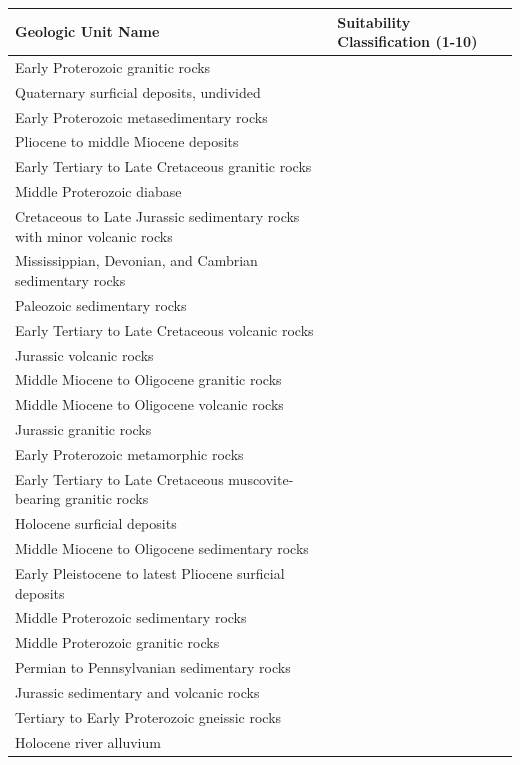 \documentclass[
]{agujournal2019}
\begin{document}
\begin{longtable}[]{@{}
  >{\raggedright\arraybackslash}p{}
  >{\raggedright\arraybackslash}p{}@{}}
\toprule\noalign{}
\begin{minipage}[b]{\linewidth}\raggedright
Geologic Unit Name
\end{minipage} & \begin{minipage}[b]{\linewidth}\raggedright
Suitability Classification (1-10)
\end{minipage} \\
\midrule\noalign{}
\endhead
\bottomrule\noalign{}
\endlastfoot
Early Proterozoic granitic rocks & \\
Quaternary surficial deposits, undivided & \\
Early Proterozoic metasedimentary rocks & \\
Pliocene to middle Miocene deposits & \\
Early Tertiary to Late Cretaceous granitic rocks & \\
Middle Proterozoic diabase & \\
Cretaceous to Late Jurassic sedimentary rocks with minor volcanic rocks
& \\
Mississippian, Devonian, and Cambrian sedimentary rocks & \\
Paleozoic sedimentary rocks & \\
Early Tertiary to Late Cretaceous volcanic rocks & \\
Jurassic volcanic rocks & \\
Middle Miocene to Oligocene granitic rocks & \\
Middle Miocene to Oligocene volcanic rocks & \\
Jurassic granitic rocks & \\
Early Proterozoic metamorphic rocks & \\
Early Tertiary to Late Cretaceous muscovite-bearing granitic rocks & \\
Holocene surficial deposits & \\
Middle Miocene to Oligocene sedimentary rocks & \\
Early Pleistocene to latest Pliocene surficial deposits & \\
Middle Proterozoic sedimentary rocks & \\
Middle Proterozoic granitic rocks & \\
Permian to Pennsylvanian sedimentary rocks & \\
Jurassic sedimentary and volcanic rocks & \\
Tertiary to Early Proterozoic gneissic rocks & \\
Holocene river alluvium & \\
\end{longtable}
\end{document}
